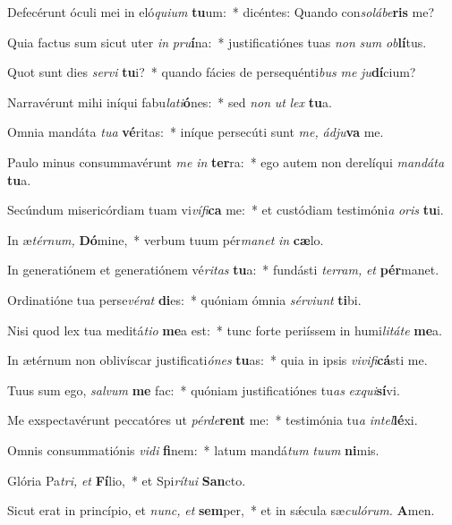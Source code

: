 \item Defecérunt óculi mei in eló\textit{quium} \textbf{tu}um:~* dicéntes: Quando con\tinyhspace\textit{solábe}\textbf{ris} me?
\item Quia factus sum sicut uter \textit{in} \textit{pru}\textbf{í}na:~* justificatiónes tuas \textit{non} \textit{sum} \textit{ob}\textbf{lí}tus.
\item Quot sunt dies \textit{servi} \textbf{tu}i?~* quando fácies de persequénti\textit{bus} \textit{me} \textit{ju}\textbf{dí}cium?
\item Narravérunt mihi iníqui fabu\tinyhspace\textit{lati}\textbf{ó}nes:~* sed \textit{non} \textit{ut} \textit{lex} \textbf{tu}a.
\item Omnia mandáta \textit{tua} \textbf{vé}ritas:~* iníque persecúti sunt \textit{me,} \textit{ádju}\textbf{va} me.
\item Paulo minus consummavérunt \textit{me} \textit{in} \textbf{ter}ra:~* ego autem non derelíqui \textit{mandáta} \textbf{tu}a.
\item Secúndum misericórdiam tuam vi\textit{vífi}\textbf{ca} me:~* et custódiam testimóni\tinyhspace\textit{a} \textit{oris} \textbf{tu}i.
\item In æ\textit{térnum,} \textbf{Dó}mine,~* verbum tuum pér\textit{manet} \textit{in} \textbf{cæ}lo.
\item In generatiónem et generatiónem vé\hspace*{0.01em}\textit{ritas} \textbf{tu}a:~* fundásti \textit{terram,} \textit{et} \textbf{pér}manet.
\item Ordinatióne tua perse\textit{vérat} \textbf{di}es:~* quóniam ómnia \textit{sérviunt} \textbf{ti}bi.
\item Nisi quod lex tua meditá\textit{tio} \textbf{me}a est:~* tunc forte periíssem in humi\textit{litáte} \textbf{me}a.
\item In ætérnum non oblivíscar justificati\textit{ónes} \textbf{tu}as:~* quia in i\-psis \textit{vivifi}\textbf{cá}sti me.
\item Tuus sum ego, \textit{salvum} \textbf{me} fac:~* quóniam justificatiónes tu\tinyhspace\textit{as} \textit{exqui}\textbf{sí}vi.
\item Me exspectavérunt peccatóres ut \textit{pérde}\textbf{rent} me:~* testimónia tu\textit{a} \textit{intel}\textbf{lé}xi.
\item Omnis consummatiónis \textit{vidi} \textbf{fi}nem:~* latum mandá\textit{tum} \textit{tuum} \textbf{ni}mis.
\item Glória Pa\tinyhspace\textit{tri,} \textit{et} \textbf{Fí}lio,~* et Spi\tinyhspace\textit{rítui} \textbf{San}cto.
\item Sicut erat in princípio, et \textit{nunc,} \textit{et} \textbf{sem}per,~* et in sǽcula sæ\textit{culórum.} \textbf{A}men.
